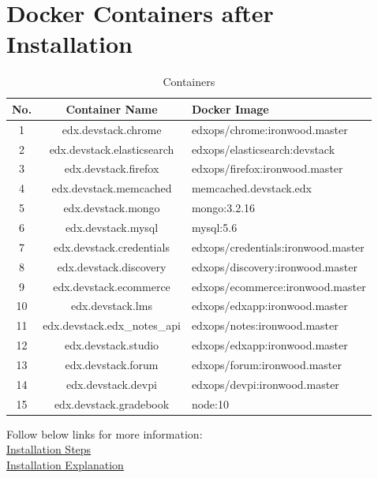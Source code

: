 \documentclass[11pt]{report}
\begin{document}
	\section{Docker Containers after Installation}
	\begin{table}[H]
		\begin{center}
			\begin{tabular}{|c|c|p{7cm}|}
				\hline
				\textbf{No.} & \textbf{Container Name} & \textbf{Docker Image} \\
				\hline
				1 & edx.devstack.chrome & edxops/chrome:ironwood.master  \\
				\hline
				2 & edx.devstack.elasticsearch & edxops/elasticsearch:devstack \\
				\hline
				3 & edx.devstack.firefox & edxops/firefox:ironwood.master \\
				\hline
				4 & edx.devstack.memcached & memcached.devstack.edx \\
				\hline
				5 & edx.devstack.mongo & mongo:3.2.16 \\
				\hline
				6 & edx.devstack.mysql & mysql:5.6 \\
				\hline
				7 & edx.devstack.credentials & edxops/credentials:ironwood.master \\
				\hline
				8 & edx.devstack.discovery & edxops/discovery:ironwood.master \\
				\hline
				9 & edx.devstack.ecommerce & edxops/ecommerce:ironwood.master \\
				\hline
				10 & edx.devstack.lms & edxops/edxapp:ironwood.master \\
				\hline
				11 & edx.devstack.edx\_notes\_api & edxops/notes:ironwood.master \\
				\hline
				12 & edx.devstack.studio & edxops/edxapp:ironwood.master \\
				\hline
				13 & edx.devstack.forum & edxops/forum:ironwood.master \\
				\hline
				14 & edx.devstack.devpi & edxops/devpi:ironwood.master \\
				\hline
				15 & edx.devstack.gradebook & node:10 \\
				\hline
				
			\end{tabular}
			\caption{Containers}
		\end{center}
	\end{table}
	
	
	\large
	Follow below links for more information: \ \\
	\href{https://github.com/fresearchgroup/Micro-Cloud-setup-using-Openshift-on-commodity-servers/blob/master/openedX\_Devstack\_Installation/Installation\%20steps\%20and\%20Errors.docx}{Installation Steps}
	\ \\
	\href{https://github.com/fresearchgroup/Micro-Cloud-setup-using-Openshift-on-commodity-servers/blob/master/openedX\_Devstack\_Installation/Explanation\%20Ironwood\_Docker\%20Installation.docx}{Installation Explanation}
	
\end{document}

